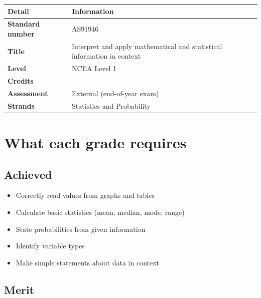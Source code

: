 \documentclass[
  11pt,
  a4paper,
  oneside,
  open=any]{scrbook}
\providecommand{\tightlist}{%
  \setlength{\itemsep}{0pt}\setlength{\parskip}{0pt}}
\begin{document}
\begin{longtable}[]{@{}
  >{\raggedright\arraybackslash}p{}
  >{\raggedright\arraybackslash}p{}@{}}
\toprule\noalign{}
\begin{minipage}[b]{\linewidth}\raggedright
Detail
\end{minipage} & \begin{minipage}[b]{\linewidth}\raggedright
Information
\end{minipage} \\
\midrule\noalign{}
\endhead
\bottomrule\noalign{}
\endlastfoot
\textbf{Standard number} & AS91946 \\
\textbf{Title} & Interpret and apply mathematical and statistical
information in context \\
\textbf{Level} & NCEA Level 1 \\
\textbf{Credits} & 4 \\
\textbf{Assessment} & External (end-of-year exam) \\
\textbf{Strands} & Statistics and Probability \\
\end{longtable}

\section{What each grade requires}\label{what-each-grade-requires}

\subsection{Achieved}\label{achieved}

\begin{itemize}
\tightlist
\item
  Correctly read values from graphs and tables
\item
  Calculate basic statistics (mean, median, mode, range)
\item
  State probabilities from given information
\item
  Identify variable types
\item
  Make simple statements about data in context
\end{itemize}

\subsection{Merit}\label{merit}
\end{document}
